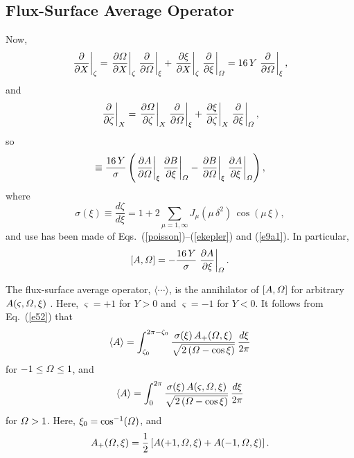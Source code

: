 \documentclass{iopjournal}
\begin{document}
{\subsection{Flux-Surface Average Operator}
Now, 
\begin{equation}\label{e49}
\left.\frac{\partial}{\partial X}\right|_\zeta= \left.\frac{\partial{\mit\Omega}}{\partial X}\right|_\zeta\left.\frac{\partial}{\partial{\mit\Omega}}\right|_{\xi}+ \left.\frac{\partial\xi}{\partial X}\right|_\zeta\left.\frac{\partial}{\partial\xi}\right|_{\mit\Omega}=16\,Y\left.\frac{\partial}{\partial{\mit\Omega}}\right|_{\xi},
\end{equation}
and
\begin{equation}
\left.\frac{\partial}{\partial \zeta}\right|_X= \left.\frac{\partial{\mit\Omega}}{\partial \zeta}\right|_X\left.\frac{\partial}{\partial{\mit\Omega}}\right|_{\xi}+ \left.\frac{\partial\xi}{\partial \zeta}\right|_X\left.\frac{\partial}{\partial\xi}\right|_{\mit\Omega},
\end{equation}
so
\begin{equation}
[A,B] \equiv \frac{16\,Y}{\sigma}\left(\left.\frac{\partial A}{\partial{\mit\Omega}}\right|_\xi\left.\frac{\partial B}{\partial\xi}\right|_{\mit\Omega}-\left.\frac{\partial B}{\partial{\mit\Omega}}\right|_\xi\left.\frac{\partial A}{\partial\xi}\right|_{\mit\Omega}\right),
\end{equation}
where
\begin{equation}\label{sigma}
\sigma(\xi) \equiv\frac{d\zeta}{d\xi}=  1+2\sum_{\mu=1,\infty} J_\mu(\mu\,\delta^2)\,\cos(\mu\,\xi),
\end{equation}
and use has been made of Eqs.~(\ref{poisson})--(\ref{ekepler}) and (\ref{e9a1}). 
In particular,
\begin{equation}\label{e52}
[A,{\mit\Omega}] = -\frac{16\,Y}{\sigma}\left.\frac{\partial A}{\partial\xi}\right|_{\mit\Omega}.
\end{equation}

The flux-surface average operator, $\langle\cdots\rangle$, is the annihilator of $[A,{\mit\Omega}]$ for arbitrary $A(\varsigma,{\mit\Omega},\xi)$ \cite{ntm2,island}. Here, $\varsigma=+1$ for $Y>0$ and $\varsigma =-1$ for
$Y<0$. It follows from Eq.~(\ref{e52}) that
\begin{equation}
\langle A\rangle = \int_{\zeta_0}^{2\pi-\zeta_0}\frac{\sigma(\xi)\,A_+({\mit\Omega},\xi)}{\sqrt{2\,({\mit\Omega}-\cos\xi)}}\,\frac{d\xi}{2\pi}
\end{equation}
for $-1\leq {\mit\Omega}\leq 1$, and
\begin{equation}\label{e55}
\langle A\rangle = \int_0^{2\pi}\frac{\sigma(\xi)\,A(\varsigma,{\mit\Omega},\xi)}{\sqrt{2\,({\mit\Omega}-\cos\xi)}}\,\frac{d\xi}{2\pi}
\end{equation}
for ${\mit\Omega}>1$. Here, $\xi_0=\cos^{-1}({\mit\Omega})$, and
\begin{equation}
A_+({\mit\Omega},\xi)= \frac{1}{2}\left[A(+1,{\mit\Omega},\xi) + A(-1,{\mit\Omega},\xi)\right].
\end{equation}

}
\end{document}
